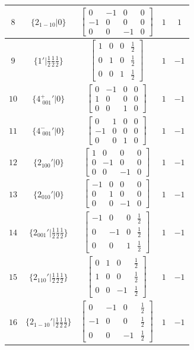 \documentclass[fleqn,8pt]{jsarticle}
\begin{document}
\begin{longtable}{ccccc}
$ 8 $ & $ \{2{}_{1-10}|0\} $ & $ \begin{bmatrix} 0 & -1 & 0 & 0 \\ -1 & 0 & 0 & 0 \\ 0 & 0 & -1 & 0 \end{bmatrix} $ & $ 1 $ & $ 1 $ \\ \hline
$ 9 $ & $ \{1{}'|\frac{1}{2} \frac{1}{2} \frac{1}{2}\} $ & $ \begin{bmatrix} 1 & 0 & 0 & \frac{1}{2} \\ 0 & 1 & 0 & \frac{1}{2} \\ 0 & 0 & 1 & \frac{1}{2} \end{bmatrix} $ & $ 1 $ & $ -1 $ \\ \hline
$ 10 $ & $ \{4^{+}_{\,\,001}{}'|0\} $ & $ \begin{bmatrix} 0 & -1 & 0 & 0 \\ 1 & 0 & 0 & 0 \\ 0 & 0 & 1 & 0 \end{bmatrix} $ & $ 1 $ & $ -1 $ \\ \hline
$ 11 $ & $ \{4^{-}_{\,\,001}{}'|0\} $ & $ \begin{bmatrix} 0 & 1 & 0 & 0 \\ -1 & 0 & 0 & 0 \\ 0 & 0 & 1 & 0 \end{bmatrix} $ & $ 1 $ & $ -1 $ \\ \hline
$ 12 $ & $ \{2{}_{100}{}'|0\} $ & $ \begin{bmatrix} 1 & 0 & 0 & 0 \\ 0 & -1 & 0 & 0 \\ 0 & 0 & -1 & 0 \end{bmatrix} $ & $ 1 $ & $ -1 $ \\ \hline
$ 13 $ & $ \{2{}_{010}{}'|0\} $ & $ \begin{bmatrix} -1 & 0 & 0 & 0 \\ 0 & 1 & 0 & 0 \\ 0 & 0 & -1 & 0 \end{bmatrix} $ & $ 1 $ & $ -1 $ \\ \hline
$ 14 $ & $ \{2{}_{001}{}'|\frac{1}{2} \frac{1}{2} \frac{1}{2}\} $ & $ \begin{bmatrix} -1 & 0 & 0 & \frac{1}{2} \\ 0 & -1 & 0 & \frac{1}{2} \\ 0 & 0 & 1 & \frac{1}{2} \end{bmatrix} $ & $ 1 $ & $ -1 $ \\ \hline
$ 15 $ & $ \{2{}_{110}{}'|\frac{1}{2} \frac{1}{2} \frac{1}{2}\} $ & $ \begin{bmatrix} 0 & 1 & 0 & \frac{1}{2} \\ 1 & 0 & 0 & \frac{1}{2} \\ 0 & 0 & -1 & \frac{1}{2} \end{bmatrix} $ & $ 1 $ & $ -1 $ \\ \hline
$ 16 $ & $ \{2{}_{1-10}{}'|\frac{1}{2} \frac{1}{2} \frac{1}{2}\} $ & $ \begin{bmatrix} 0 & -1 & 0 & \frac{1}{2} \\ -1 & 0 & 0 & \frac{1}{2} \\ 0 & 0 & -1 & \frac{1}{2} \end{bmatrix} $ & $ 1 $ & $ -1 $ \\
\end{longtable}
\end{document}
